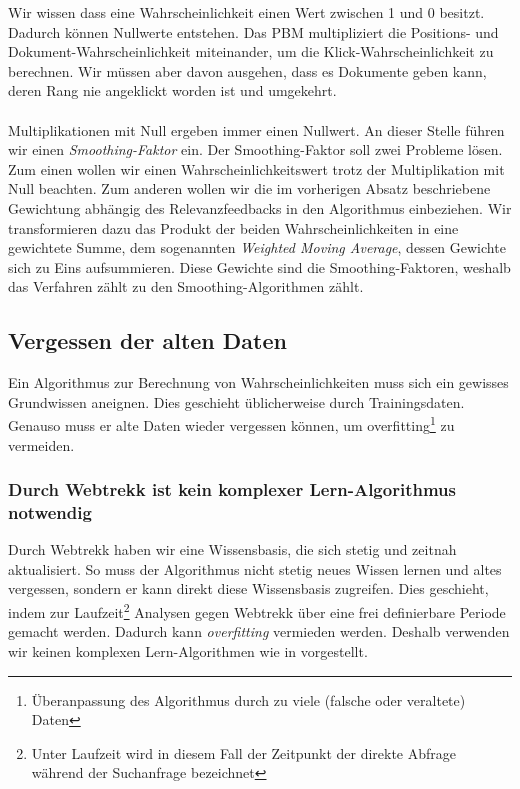 Wir wissen dass eine Wahrscheinlichkeit einen Wert zwischen 1 und 0 besitzt. Dadurch können Nullwerte entstehen. Das PBM multipliziert die Positions- und Dokument-Wahrscheinlichkeit miteinander, um die Klick-Wahrscheinlichkeit zu berechnen. Wir müssen aber davon ausgehen, dass es Dokumente geben kann, deren Rang nie angeklickt worden ist und umgekehrt. 
\\
\\
Multiplikationen mit Null ergeben immer einen Nullwert. An dieser Stelle führen wir einen \textit{Smoothing-Faktor} ein. Der Smoothing-Faktor soll zwei Probleme lösen. Zum einen wollen wir einen Wahrscheinlichkeitswert trotz der Multiplikation mit Null beachten. Zum anderen wollen wir die im vorherigen Absatz beschriebene Gewichtung abhängig des Relevanzfeedbacks in den Algorithmus einbeziehen. Wir transformieren dazu das Produkt der beiden Wahrscheinlichkeiten in eine gewichtete Summe, dem sogenannten \textit{Weighted Moving Average}, dessen Gewichte sich zu Eins aufsummieren. Diese Gewichte sind die Smoothing-Faktoren, weshalb das Verfahren zählt zu den Smoothing-Algorithmen zählt.

\subsection{Vergessen der alten Daten}
\label{sec:Reranking:Methodik:Vergessen}

Ein Algorithmus zur Berechnung von Wahrscheinlichkeiten muss sich ein gewisses Grundwissen aneignen. Dies geschieht üblicherweise durch Trainingsdaten. Genauso muss er alte Daten wieder vergessen können, um overfitting\footnote{Überanpassung des Algorithmus durch zu viele (falsche oder veraltete) Daten} zu vermeiden. 

\subsubsection{Durch Webtrekk ist kein komplexer Lern-Algorithmus notwendig}
\label{sec:Reranking:Methodik:Vergessen:Lern-Algorithmus}

Durch Webtrekk haben wir eine Wissensbasis, die sich stetig und zeitnah aktualisiert. So muss der Algorithmus nicht stetig neues Wissen lernen und altes vergessen, sondern er kann direkt diese Wissensbasis zugreifen. Dies geschieht, indem zur Laufzeit\footnote{Unter Laufzeit wird in diesem Fall der Zeitpunkt der direkte Abfrage während der Suchanfrage bezeichnet} Analysen gegen Webtrekk über eine frei definierbare Periode gemacht werden. Dadurch kann \textit{overfitting} vermieden werden. Deshalb verwenden wir keinen komplexen Lern-Algorithmen wie in \cite{IWUSBI} vorgestellt.

